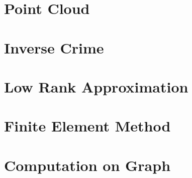 \section{Point Cloud}

\section{Inverse Crime}

\section{Low Rank Approximation}

\section{Finite Element Method}

\section{Computation on Graph}